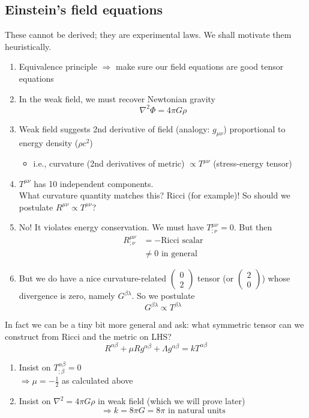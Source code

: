 \documentclass[a4paper]{article} %
\newcommand{\pmx}[1]{
\begin{pmatrix}
#1
\end{pmatrix}
}
\begin{document}
\subsection{Einstein's field equations}
These cannot be derived; they are experimental laws. We shall motivate them heuristically.

\begin{enumerate}
\item Equivalence principle $\Rightarrow$ make sure our field equations are good tensor equations
\item In the weak field, we must recover Newtonian gravity
\begin{equation}
\nabla^2 \Phi = 4\pi G\rho
\end{equation}
\item Weak field suggests 2nd derivative of field (analogy: $g_{\mu\nu}$) proportional to energy density ($\rho c^2$)
\begin{itemize}
\item i.e., curvature (2nd derivatives of metric) $\propto T^{\mu\nu}$ (stress-energy tensor)
\end{itemize}
\item $T^{\mu\nu}$ has 10 independent components. \\What curvature quantity matches this? Ricci (for example)! So should we postulate $R^{\mu\nu}\propto T^{\mu\nu}$?
\item No! It violates energy conservation. We must have $T^{\mu\nu}_{;\nu}=0$. But then 
\begin{align}
R^{\mu\nu}_{;\nu}&=-\text{Ricci scalar}\\
&\neq 0 \text{ in general}
\end{align}
\item But we do have a nice curvature-related $\pmx{0\\2}$ tensor (or $\pmx{2\\0}$) whose divergence is zero, namely $G^{\beta\lambda}$. So we postulate
\begin{equation}
G^{\beta\lambda}\propto T^{\beta\lambda}
\end{equation}
\end{enumerate}
In fact we can be a tiny bit more general and ask: what symmetric tensor can we construct from Ricci and the metric on LHS?
\begin{equation}
R^{\alpha\beta}+\mu R g^{\alpha\beta} + \Lambda g^{\alpha\beta}=kT^{\alpha\beta}
\end{equation}
\begin{enumerate}
\item Insist on $T^{\alpha\beta}_{;\beta}=0$\\$\Rightarrow \mu = -\frac{1}{2}$ as calculated above
\item Insist on $\nabla^2=4\pi G\rho$ in weak field (which we will prove later)
\begin{equation}
\Rightarrow k = 8\pi G = 8\pi\text{ in natural units}
\end{equation}
\end{enumerate}
\end{document}

